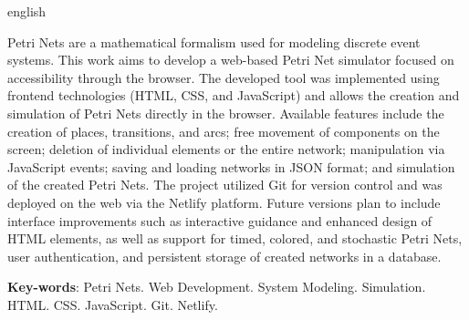 \documentclass[
	12pt,				%
	openright,			%
	oneside,			%
	a4paper,			%
	english,			%
	brazil				%
	]{abntex2}
\begin{document}
\begin{resumo}[Abstract]
 \begin{otherlanguage*}{english}

\noindent 

Petri Nets are a mathematical formalism used for modeling discrete event systems. This work aims to develop a web-based Petri Net simulator focused on accessibility through the browser. The developed tool was implemented using frontend technologies (HTML, CSS, and JavaScript) and allows the creation and simulation of Petri Nets directly in the browser. Available features include the creation of places, transitions, and arcs; free movement of components on the screen; deletion of individual elements or the entire network; manipulation via JavaScript events; saving and loading networks in JSON format; and simulation of the created Petri Nets. The project utilized Git for version control and was deployed on the web via the Netlify platform. Future versions plan to include interface improvements such as interactive guidance and enhanced design of HTML elements, as well as support for timed, colored, and stochastic Petri Nets, user authentication, and persistent storage of created networks in a database.

   \vspace{\onelineskip}

   \noindent
   \textbf{Key-words}: Petri Nets. Web Development. System Modeling. Simulation. HTML. CSS. JavaScript. Git. Netlify.
 \end{otherlanguage*}
\end{resumo}


\listoffigures*
\cleardoublepage


\cleardoublepage
{} %
\renewcommand{\lstlistlistingname}{Lista de Códigos}
\lstlistoflistings %
\cleardoublepage







\end{document}
